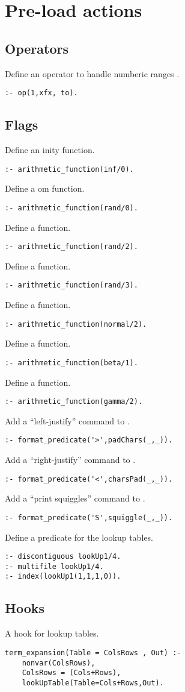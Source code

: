 \section{ Pre-load actions  
}
\subsection{ Operators 
}
Define an operator to handle numberic ranges
.
\begin{Verbatim}
:- op(1,xfx, to).
\end{Verbatim}
\subsection{ Flags 
}
Define an inity function. 
\begin{Verbatim}
:- arithmetic_function(inf/0).
\end{Verbatim}
Define a om function.
\begin{Verbatim}
:- arithmetic_function(rand/0).
\end{Verbatim}
Define a  function.
\begin{Verbatim}
:- arithmetic_function(rand/2).
\end{Verbatim}
Define a  function.
\begin{Verbatim}
:- arithmetic_function(rand/3).
\end{Verbatim}
Define a  function.
\begin{Verbatim}
:- arithmetic_function(normal/2).
\end{Verbatim}
Define a  function.
\begin{Verbatim}
:- arithmetic_function(beta/1).
\end{Verbatim}
Define a  function.
\begin{Verbatim}
:- arithmetic_function(gamma/2).
\end{Verbatim}
Add a ``left-justify'' command to .
\begin{Verbatim}
:- format_predicate('>',padChars(_,_)).
\end{Verbatim}
Add a ``right-justify'' command to .
\begin{Verbatim}
:- format_predicate('<',charsPad(_,_)).
\end{Verbatim}
Add a ``print squiggles'' command to .
\begin{Verbatim}
:- format_predicate('S',squiggle(_,_)).
\end{Verbatim}
Define a predicate for the lookup tables.
\begin{Verbatim}
:- discontiguous lookUp1/4.
:- multifile lookUp1/4.
:- index(lookUp1(1,1,1,0)).
\end{Verbatim}
\subsection{ Hooks 
}
A hook for lookup tables.
\begin{Verbatim}
term_expansion(Table = ColsRows , Out) :- 
    nonvar(ColsRows),
    ColsRows = (Cols+Rows),
    lookUpTable(Table=Cols+Rows,Out). 
\end{Verbatim}
